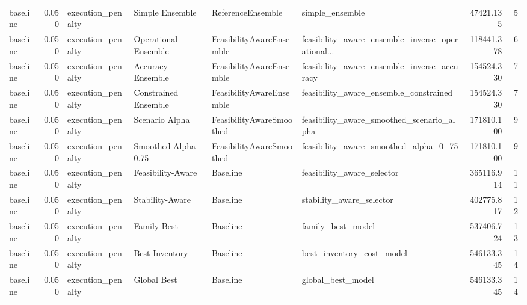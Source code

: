 \begin{table}
{\begin{tabular}{lrllllrr}
      baseline &             0.050 &           execution\_penalty &       Simple Ensemble &         ReferenceEnsemble &                                    simple\_ensemble &     47421.135 &               5 \\
      baseline &             0.050 &           execution\_penalty &  Operational Ensemble &  FeasibilityAwareEnsemble &  feasibility\_aware\_ensemble\_inverse\_operational... &    118441.378 &               6 \\
      baseline &             0.050 &           execution\_penalty &     Accuracy Ensemble &  FeasibilityAwareEnsemble &        feasibility\_aware\_ensemble\_inverse\_accuracy &    154524.330 &               7 \\
      baseline &             0.050 &           execution\_penalty &  Constrained Ensemble &  FeasibilityAwareEnsemble &             feasibility\_aware\_ensemble\_constrained &    154524.330 &               7 \\
      baseline &             0.050 &           execution\_penalty &        Scenario Alpha &  FeasibilityAwareSmoothed &          feasibility\_aware\_smoothed\_scenario\_alpha &    171810.100 &               9 \\
      baseline &             0.050 &           execution\_penalty &   Smoothed Alpha 0.75 &  FeasibilityAwareSmoothed &              feasibility\_aware\_smoothed\_alpha\_0\_75 &    171810.100 &               9 \\
      baseline &             0.050 &           execution\_penalty &     Feasibility-Aware &                  Baseline &                         feasibility\_aware\_selector &    365116.914 &              11 \\
      baseline &             0.050 &           execution\_penalty &       Stability-Aware &                  Baseline &                           stability\_aware\_selector &    402775.817 &              12 \\
      baseline &             0.050 &           execution\_penalty &           Family Best &                  Baseline &                                  family\_best\_model &    537406.724 &              13 \\
      baseline &             0.050 &           execution\_penalty &        Best Inventory &                  Baseline &                          best\_inventory\_cost\_model &    546133.345 &              14 \\
      baseline &             0.050 &           execution\_penalty &           Global Best &                  Baseline &                                  global\_best\_model &    546133.345 &              14 \\

\end{tabular}}
\end{table}

